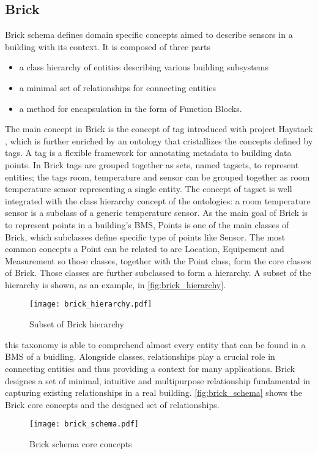\subsection{Brick} \label{subsec:brick}
Brick schema \cite{brick_schema} defines domain specific concepts aimed to describe sensors in a building with its context. It is composed of three parts
\begin{itemize}
  \item a class hierarchy of entities describing various building subsystems
  \item a minimal set of relationships for connecting entities
  \item a method for encapsulation in the form of Function Blocks.
\end{itemize}
The main concept in Brick is the concept of tag introduced with project Haystack \cite{project_haystack}, which is further enriched by an ontology that cristallizes the concepts defined by tags. A tag is a flexible framework for annotating metadata to building data points. In Brick tags are grouped together as sets, named tagsets, to represent entities; the tags {room}, {temperature} and {sensor} can be grouped together as {room temperature sensor} representing a single entity. The concept of tagset is well integrated with the class hierarchy concept of the ontologies: a {room temperature sensor} is a subclass of a generic {temperature sensor}.
As the main goal of Brick is to represent points in a building's BMS, Points is one of the main classes of Brick, which subclasses define specific type of points like Sensor. The most common concepts a Point can be related to are Location, Equipement and Measurement so those classes, together with the Point class, form the core classes of Brick. Those classes are further subclassed to form a hierarchy. A subset of the hierarchy is shown, as an example, in \autoref{fig:brick_hierarchy}.
\begin{figure}
  \centering
  \texttt{[image: brick\_hierarchy.pdf]}
  \caption{Subset of Brick hierarchy}
  \label{fig:brick_hierarchy}
\end{figure}
this taxonomy is able to comprehend almost every entity that can be found in a BMS of a buidling\cite{brick_schema}. Alongside classes, relationships play a crucial role in connecting entities and thus providing a context for many applications. Brick designes a set of minimal, intuitive and multipurpose relationship fundamental in capturing existing relationships in a real building. \autoref{fig:brick_schema} shows the Brick core concepts and the designed set of relationships.
\begin{figure}
  \centering
  \texttt{[image: brick\_schema.pdf]}
  \caption{Brick schema core concepts}
  \label{fig:brick_schema}
\end{figure}


